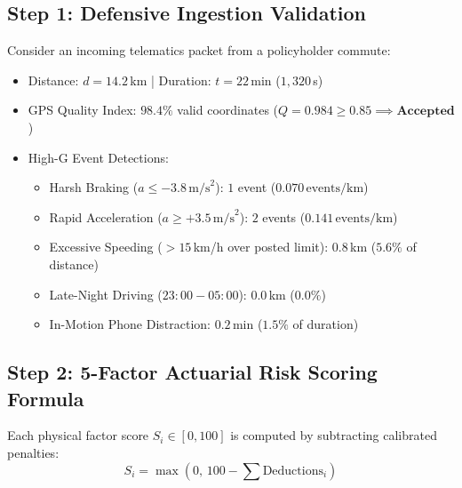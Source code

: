 \documentclass[11pt,a4paper]{article}
\begin{document}
\subsection{Step 1: Defensive Ingestion Validation}
Consider an incoming telematics packet from a policyholder commute:
\begin{itemize}[noitemsep]
    \item Distance: $d = 14.2$\,km \quad | \quad Duration: $t = 22$\,min ($1,320$\,s)
    \item GPS Quality Index: $98.4\%$ valid coordinates ($Q = 0.984 \ge 0.85 \implies \textbf{Accepted}$)
    \item High-G Event Detections:
    \begin{itemize}[noitemsep]
        \item Harsh Braking ($a \le -3.8\,\text{m/s}^2$): $1$ event ($0.070\,\text{events/km}$)
        \item Rapid Acceleration ($a \ge +3.5\,\text{m/s}^2$): $2$ events ($0.141\,\text{events/km}$)
        \item Excessive Speeding ($>15$\,km/h over posted limit): $0.8$\,km ($5.6\%$ of distance)
        \item Late-Night Driving ($23:00 - 05:00$): $0.0$\,km ($0.0\%$)
        \item In-Motion Phone Distraction: $0.2$\,min ($1.5\%$ of duration)
    \end{itemize}
\end{itemize}

\subsection{Step 2: 5-Factor Actuarial Risk Scoring Formula}
Each physical factor score $S_i \in [0, 100]$ is computed by subtracting calibrated penalties:
\begin{equation}
    S_i = \max\left(0,\, 100 - \sum \text{Deductions}_i\right)
\end{equation}
\end{document}
